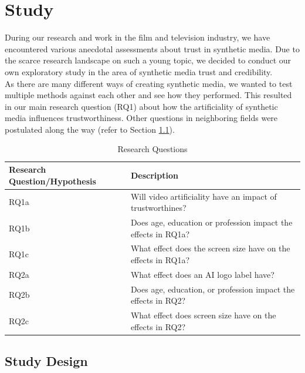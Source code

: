 \documentclass[
  a4paper,  %
  twoside,  %
  bibliography=totoc,
  headsepline,
  cleardoublepage=empty,
  parskip=half,
  draft=false
]{scrbook}
\begin{document}
\chapter{Study}
\label{chap:study}

During our research and work in the film and television industry, we have encountered various anecdotal assessments about trust in synthetic media. Due to the scarce research landscape on such a young topic, we decided to conduct our own exploratory study in the area of synthetic media trust and credibility. \\
As there are many different ways of creating synthetic media, we wanted to test multiple methods against each other and see how they performed. This resulted in our main research question (RQ1) about how the artificiality of synthetic media influences trustworthiness. Other questions in neighboring fields were postulated along the way (refer to Section \ref{tab:research-questions}).

\begin{table}[h]
  \centering
  \begin{tabularx}{\textwidth}{l|X}
    \textbf{Research Question/Hypothesis} & \textbf{Description}\\
    \midrule
    RQ1a & Will video artificiality have an impact of trustworthines?  \\
    \midrule
    RQ1b & Does age, education or profession impact the effects in RQ1a?  \\
    \midrule
    RQ1c & What effect does the screen size have on the effects in RQ1a?  \\
    \midrule
    RQ2a & What effect does an AI logo label have?\\
    \midrule
    RQ2b & Does age, education, or profession impact the effects in RQ2?  \\
    \midrule
    RQ2c & What effect does screen size have on the effects in RQ2?  \\
  \end{tabularx}
  \caption{Research Questions}
  \label{tab:research-questions}
\end{table}

\section{Study Design}
\label{sec:study design}
\end{document}

